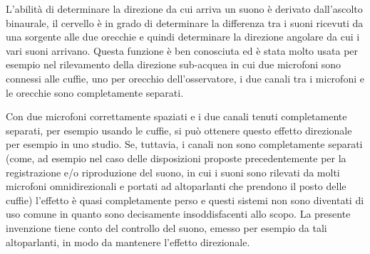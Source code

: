 \documentclass[11pt]{article}
\begin{document}
\begin{multicols*}{2}
L’abilità di determinare la direzione da cui arriva un suono è derivato dall’ascolto binaurale, il cervello è in grado di determinare la differenza tra i suoni ricevuti da una sorgente alle due orecchie e quindi determinare la direzione angolare da cui i vari suoni arrivano. Questa funzione è ben conosciuta ed è stata molto usata per esempio nel rilevamento della direzione sub-acquea in cui due microfoni sono connessi alle cuffie, uno per orecchio dell’osservatore, i due canali tra i microfoni e le orecchie sono completamente separati.

Con due microfoni correttamente spaziati e i due canali tenuti completamente separati, per esempio usando le cuffie, si può ottenere questo effetto direzionale per esempio in uno studio. Se, tuttavia, i canali non sono completamente separati (come, ad esempio nel caso delle disposizioni proposte precedentemente per la registrazione e/o riproduzione del suono, in cui i suoni sono rilevati da molti microfoni omnidirezionali e portati ad altoparlanti che prendono il posto delle cuffie) l’effetto è quasi completamente perso e questi sistemi non sono diventati di uso comune in quanto sono decisamente insoddisfacenti allo scopo. La presente invenzione tiene conto del controllo del suono, emesso per esempio da tali altoparlanti, in modo da mantenere l’effetto direzionale.


\end{multicols*}
\end{document}
